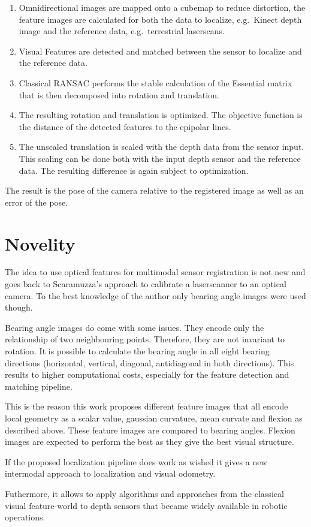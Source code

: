 \begin{enumerate}
\item Omnidirectional images are mapped onto a cubemap to reduce distortion,
  the feature images are calculated for both the data to localize,
  e.g.~Kinect depth image and the reference data, e.g.~terrestrial
  laserscans.
\item Visual Features are detected and matched between the sensor to
  localize and the reference data.
\item Classical RANSAC performs the stable calculation of the
  Essential matrix that is then decomposed into rotation and translation.
\item The resulting rotation and translation is optimized. The objective
  function is the distance of the detected features to the epipolar
  lines.
\item The unscaled translation is scaled with the depth data from the sensor
  input. This scaling can be done both with the input depth sensor and
  the reference data. The resulting difference is again subject to
  optimization.
\end{enumerate}

The result is the pose of the camera relative to the registered image as well as an error of the pose.

\section{Novelity}\label{novelity}

The idea to use optical features for multimodal sensor registration is
not new and goes back to Scaramuzza's approach to calibrate a
laserscanner to an optical camera. To the best knowledge of the author
only bearing angle images were used though.

Bearing angle images do come with some issues. They encode only the
relationship of two neighbouring points. Therefore, they are not
invariant to rotation. It is possible to calculate the bearing angle in
all eight bearing directions (horizontal, vertical, diagonal, antidiagonal in
both directions). This results to higher computational costs, especially
for the feature detection and matching pipeline.

This is the reason this work proposes different feature images that all
encode local geometry as a scalar value, gaussian curvature, mean
curvate and flexion as described above. These feature images are
compared to bearing angles. Flexion images are expected to perform the best
as they give the best visual structure.

If the proposed localization pipeline does work as wished it gives a new
intermodal approach to localization and visual odometry.

Futhermore, it allows to apply algorithms and approaches from the
classical visual feature-world to depth sensors that became widely
available in robotic operations.
